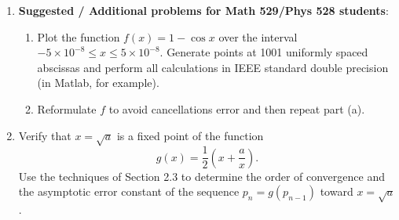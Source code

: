 \documentclass [12pt]{article}
\begin{document}
\begin{enumerate}

\smallskip
{}


\bigskip

\item{{\bf Suggested / Additional problems for Math 529/Phys 528 students}}: 

\begin{enumerate}

\item Plot the function $f(x)=1-\cos x$ over the interval $-5\times 10^{-8}\leq x\leq 5\times 10^{-8}$. Generate points at 1001 uniformly spaced abscissas and perform all calculations in IEEE standard double precision (in Matlab, for example).

\item Reformulate $f$ to avoid cancellations error and then repeat part (a).
\end{enumerate}

\item %

Verify that $x=\sqrt{a}$ is a fixed point of the function
%
\[
g(x)=\frac 12 \left(x+\frac ax\right).
\]
%
Use the techniques of Section 2.3 to determine the order of convergence and the asymptotic error constant of the sequence $p_n=g(p_{n-1})$ toward $x=\sqrt a$.

\end{enumerate}
\end{document}

